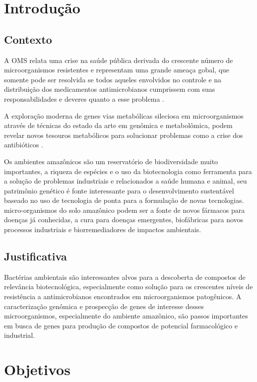 \chapter{Introdução}
\label{cap:introducao}

\section{Contexto}

A OMS relata uma crise na saúde pública derivada do crescente número
de microorganismos resistentes e representam uma grande ameaça gobal, que somente
pode ser resolvida se todos aqueles envolvidos no controle e na distribuição
dos medicamentos antimicrobianos cumprissem com suas responsabilidades e deveres 
quanto a esse problema \cite{talebi2019world}.

A exploração moderna de genes vias metabólicas sileciosa em microorganismos
através de técnicas do estado da arte em genômica e metabolômica, podem
revelar novos tesouros metabólicos para solucionar problemas como a crise
dos antibióticos \cite{zhang2021glossary}.

Os ambientes amazônicos são um reservatório de biodiversidade muito importantes,
a riqueza de espécies e o uso da biotecnologia como ferramenta para a solução de problemas industriais  e relacionados
a saúde humana e animal, seu patrimônio genético é fonte interessante para o
desenvolvimento sustentável baseado no uso de tecnologia de ponta para a formulação de novas tecnologias.
micro-organismos do solo amazônico podem ser a fonte de novos fármacos para doenças já conhecidas,
a cura para doenças emergentes, biofábricas para novos processos industriais e biorremediadores
de impactos ambientais.

\section{Justificativa}
Bactérias ambientais são interessantes alvos para a descoberta de compostos
de relevância biotecnológica, especialmente como solução para os crescentes níveis
de resistência a antimicrobianos encontrados em microorganismos patogênicos.
A caracterização genômica e prospecção de genes de interesse desses microorganismos,
especialmente do ambiente amazônico, são passos importantes
em busca de genes para produção de compostos de potencial farmacológico e industrial.

\chapter{Objetivos}

